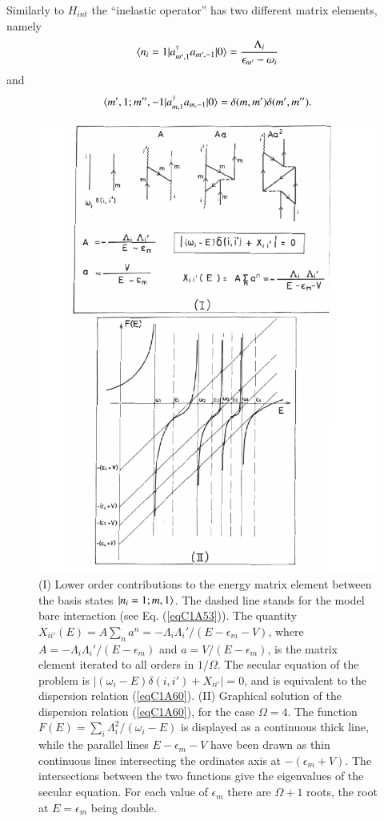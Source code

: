 Similarly to $H_{int}$ the ``inelastic operator'' has two different matrix elements, namely 
 \begin{align}\label{eqC1A54} 
 \langle {n_i=1|a^\dagger_{m',1}a_{m',-1}|0} \rangle=\frac{\Lambda_i}{\epsilon_{m'}-\omega_i}
 \end{align} 
 and
  \begin{align}\label{eqC1A55} 
 \langle {m',1;m'',-1|a^\dagger_{m,1}a_{m,-1}|0} \rangle=\delta(m,m')\delta(m',m'').
  \end{align} 
    \begin{figure}
    \centerline {
    \includegraphics*[width=12cm]{introduccion/figs/fig21}
    }
    \caption{(I) Lower order contributions to the energy matrix element between the basis states $|{n_i=1;m,1} \rangle$. The dashed line stands for the model bare interaction (see Eq. (\ref{eqC1A53})). The quantity $X_{ii'}(E)=A\sum_na^n=-\Lambda_i\Lambda_i'/(E-\epsilon_m-V)$, where $A=-\Lambda_i\Lambda_i'/(E-\epsilon_m)$ and $a=V/(E-\epsilon_m)$, is the matrix element iterated to all orders in $1/\Omega$. The secular equation of the problem is $|(\omega_i-E)\delta(i,i')+X_{ii'}|=0$, and is equivalent to the dispersion relation (\ref{eqC1A60}). (II) Graphical solution of the dispersion relation (\ref{eqC1A60}), for the case $\Omega=4$. The function $F(E)=\sum_i\Lambda_i^2/(\omega_i-E)$ is displayed as a continuous thick line, while the parallel lines $E-\epsilon_m-V$ have been drawn as thin continuous lines intersecting the ordinates axis at $-(\epsilon_m+V)$. The intersections between the two functions give the eigenvalues of the secular equation. For each value of $\epsilon_m$ there are $\Omega+1$ roots, the root at $E=\epsilon_m$ being double.}
    \label{figC1A4}
    \end{figure}

